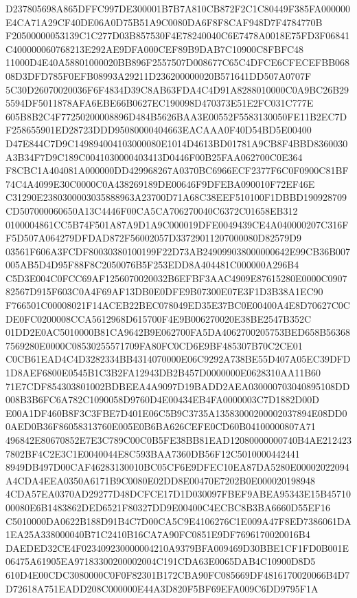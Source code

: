 \documentclass[UTF8,fontset=fandol,zihao=-4,a4paper]{ctexart}
\begin{document}
{{D237805698A865DFFC997DE300001B7B7A810CB872F2C1C80449F385FA000000E4CA71A29CF40DE06A0D75B51A9C0080DA6F8F8CAF948D7F4784770B
F20500000053139C1C277D03B857530F4E78240040C6E7478A0018E75FD3F06841C400000060768213E292AE9DFA000CEF89B9DAB7C10900C8FBFC48
11000D4E40A58801000020BB896F2557507D008677C65C4DFCE6CFECEFBB06808D3DFD785F0EFB08993A29211D236200000020B571641DD507A0707F
5C30D26070020036F6F4834D39C8AB63FDA4C4D91A8288010000C0A9BC26B295594DF5011878AFA6EBE66B0627EC190098D470373E51E2FC031C777E
605B8B2C4F77250200008896D484B5626BAA3E00552F5583130050FE11B2EC7DF258655901ED28723DDD95080000404663EACAAA0F40D54BD5E00400
D47E844C7D9C149894004103000080E1014D4613BD01781A9CB8F4BBD8360030A3B34F7D9C189C0041030000403413D0446F00B25FAA062700C0E364
F8CBC1A404081A000000DD429968267A0370BC6966ECF2377F6C0F0900C81BF74C4A4099E30C0000C0A438269189DE00646F9DFEBA090010F72EF46E
C31290E2380300003035888963A23700D71A68C38EEF510100F1DBBD190928709CD507000060650A13C4446F00CA5CA706270040C6372C01658EB312
0100004861CC5B74F501A87A9D1A9C000019DFE0049439CE4A040000207C316FF5D507A064279DFDAD872F56002057D33729011207000080D82579D9
03561F606A3FCDF80030380100199F22D73AB249099038000000642E99CB36B007005AB5D4D95F88F8C2050076B5F253EDD8A404481C000000A296B4
C5D3E004C0FCC69AF1256070020032B6EFBF3AAC4909E87615280E0000C090782567D915F603C0A4F69AF13DB0E0DFE9B07300E07E3F1D3B38A1EC90
F766501C00008021F14ACEB22BEC078049ED35E37BC0E00400A4E8D70627C0CDE0FC0200008CCA5612968D615700F4E9B006270020E38BE2547B352C
01DD2E0AC5010000B81CA9642B9E062700FA5DA4062700205753BED658B563687569280E0000C08530255571709FA80FC0CD6E9BF485307B70C2CE01
C0CB61EAD4C4D3282334BB4314070000E06C9292A738BE55D407A05EC39DFD1D8AEF6800E0545B1C3B2FA12943DB2B457D0000000E0628310AA11B60
71E7CDF854303801002BDBEEA4A9097D19BADD2AEA030000703040895108DD008B3B6FC6A782C1090058D9760D4E00434EB4FA0000003C7D1882D00D
E00A1DF460B8F3C3FBE7D401E06C5B9C3735A13583000200002037894E08DD00AED0B36F86058313760E005E0B6BA626CEFE0CD60B04100000807A71
496842E80670852E7E3C789C00C0B5FE38BB81EAD12080000000740B4AE2124237802BF4C2E3C1E0040044E8C593BAA7360DB56F12C5010000442441
8949DB497D00CAF46283130010BC05CF6E9DFEC10EA87DA5280E00002022094A4CDA4EEA0350A6171B9C0080E02DD8E00470E7202B0E000020198948
4CDA57EA0370AD29277D48DCFCE17D1D030097FBEF9ABEA95343E15B4571000080E6B1483862DED6521F80327DD9E00400C4ECBC8B3BA6660D55EF16
C5010000DA0622B188D91B4C7D00CA5C9E4106276C1E009A47F8ED7386061DA1EA25A338000040B71C2410B16CA7A90FC0851E9DF7696170020016B4
DAEDED32CE4F023409230000004210A9379BFA009469D30BBE1CF1FD0B001E06475A61905EA97183300200002004C191CDA63E0065DAB4C10900D8D5
610D4E00CDC3080000C0F0F82301B172CBA90FC085669DF4816170020066B4D7D72618A751EADD208C000000E44A3D820F5BF69EFA009C6DD9795F1A
}}
\end{document}
